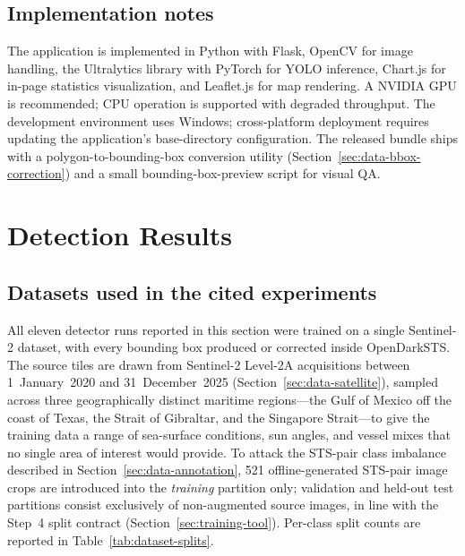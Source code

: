 \documentclass[10pt, letterpaper, twocolumn]{article}
\begin{document}
\subsection{Implementation notes}

The application is implemented in Python with Flask, OpenCV for image handling, the Ultralytics library with PyTorch for YOLO inference, Chart.js for in-page statistics visualization, and Leaflet.js for map rendering. A NVIDIA GPU is recommended; CPU operation is supported with degraded throughput. The development environment uses Windows; cross-platform deployment requires updating the application's base-directory configuration. The released bundle ships with a polygon-to-bounding-box conversion utility (Section~\ref{sec:data-bbox-correction}) and a small bounding-box-preview script for visual QA.


\section{Detection Results}
\label{sec:results}

\subsection{Datasets used in the cited experiments}
\label{sec:results-datasets}

All eleven detector runs reported in this section were trained on a single Sentinel-2 dataset, with every bounding box produced or corrected inside OpenDarkSTS. The source tiles are drawn from Sentinel-2 Level-2A acquisitions between 1~January~2020 and 31~December~2025 (Section~\ref{sec:data-satellite}), sampled across three geographically distinct maritime regions---the Gulf of Mexico off the coast of Texas, the Strait of Gibraltar, and the Singapore Strait---to give the training data a range of sea-surface conditions, sun angles, and vessel mixes that no single area of interest would provide. To attack the STS-pair class imbalance described in Section~\ref{sec:data-annotation}, 521 offline-generated STS-pair image crops are introduced into the \emph{training} partition only; validation and held-out test partitions consist exclusively of non-augmented source images, in line with the Step~4 split contract (Section~\ref{sec:training-tool}). Per-class split counts are reported in Table~\ref{tab:dataset-splits}.
\end{document}
